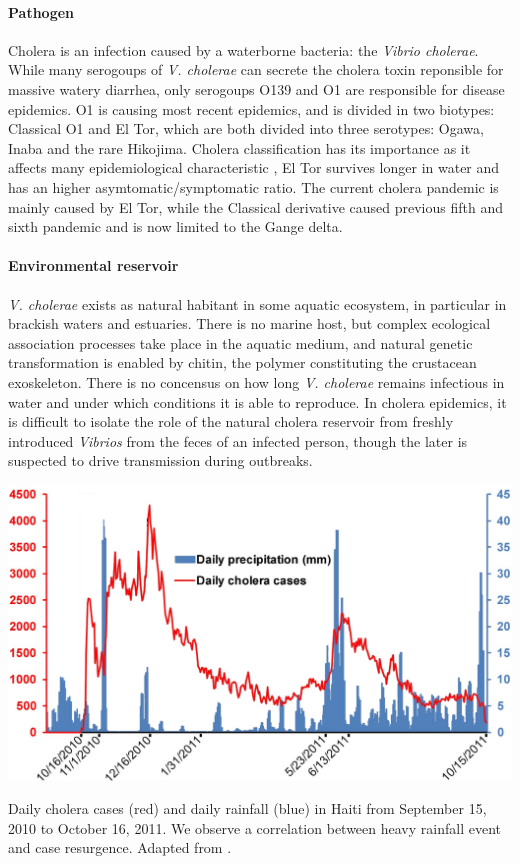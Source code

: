 \paragraph{Pathogen} Cholera is an infection caused by a waterborne bacteria: the \emph{Vibrio cholerae}. While many serogoups of \emph{V. cholerae} can secrete the cholera toxin reponsible for massive watery diarrhea, only serogoups O139 and O1 are responsible for disease epidemics. O1 is causing most recent epidemics, and is divided in two biotypes: Classical O1 and El Tor, which are both divided into three serotypes: Ogawa, Inaba and the rare Hikojima\cite{Kaper:Cholera:1995}. Cholera classification has its importance as it affects many epidemiological characteristic \eg, El Tor survives longer in water and has an higher asymtomatic/symptomatic ratio\cite{WHO:CholeraVaccinesWHO:2017}. The current cholera pandemic is mainly caused by El Tor, while the Classical derivative caused previous fifth and sixth pandemic and is now limited to the Gange delta\cite{Nair:CholeraDueAltered:2006}. 

 \paragraph{Environmental reservoir}  \textit{V. cholerae} exists as natural habitant in some aquatic ecosystem, in particular in brackish waters and estuaries. There is no marine host, but complex ecological association processes take place in the aquatic medium, and natural genetic transformation is enabled by chitin, the polymer constituting the crustacean exoskeleton\cite{Reidl:VibrioCholeraeCholera:2002,Meibom:ChitinInducesNatural:2005}. There is no concensus on how long \textit{V. cholerae} remains infectious in water and under which conditions it is able to reproduce\cite{Mavian:ToxigenicVibrioCholerae:2020}. In cholera epidemics, it is difficult to isolate the role of the natural cholera reservoir from freshly introduced \textit{Vibrios} from the feces of an infected person, though the later is suspected to drive  transmission during outbreaks.
 \begin{marginfigure}
\centering
\includegraphics[width=\textwidth]{fig/cholera-rainfall.png}
\caption[Daily cholera cases and rainfall in Haiti]{\footnotesize Daily cholera cases (red) and daily rainfall (blue) in Haiti from September 15, 2010 to October
16, 2011. We observe a correlation between heavy rainfall event and case resurgence. Adapted from .}
\label{rain}
\end{marginfigure}
